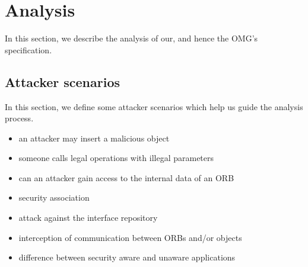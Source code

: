 
\section{Analysis} \label{sec:analysis}

In this section, we describe the analysis of our, and hence the OMG's
specification.


\subsection{Attacker scenarios}
\label{sec:attacker}

In this section, we define some attacker scenarios which help us guide the
analysis process.

\begin{itemize}
\item an attacker may insert a malicious object
\item someone calls legal operations with illegal parameters
\item can an attacker gain access to the internal data of an ORB
\item security association
\item attack against the interface repository
\item interception of communication between ORBs and/or objects
\item difference between security aware and unaware applications
\end{itemize}


